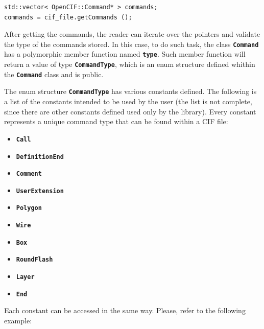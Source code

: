 \documentclass[11pt,twoside,openany,x11names,svgnames]{memoir}
\begin{document}
\begin{lstlisting}[frame=single,style=CPPStyle]
std::vector< OpenCIF::Command* > commands;
commands = cif_file.getCommands ();
\end{lstlisting}

After getting the commands, the reader can iterate over the pointers and validate the type of the commands stored. In this case, to do such task, the class \textbf{\texttt{Command}} has a polymorphic member function named \textbf{\texttt{type}}. Such member function will return a value of type \textbf{\texttt{CommandType}}, which is an enum structure defined whithin the \textbf{\texttt{Command}} class and is public.

The enum structure \textbf{\texttt{CommandType}} has various constants defined. The following is a list of the constants intended to be used by the user (the list is not complete, since there are other constants defined used only by the library). Every constant represents a unique command type that can be found within a CIF file:

\begin{itemize}
	\item \textbf{\texttt{Call}}
	\item \textbf{\texttt{DefinitionEnd}}
	\item \textbf{\texttt{Comment}}
	\item \textbf{\texttt{UserExtension}}
	\item \textbf{\texttt{Polygon}}
	\item \textbf{\texttt{Wire}}
	\item \textbf{\texttt{Box}}
	\item \textbf{\texttt{RoundFlash}}
	\item \textbf{\texttt{Layer}}
	\item \textbf{\texttt{End}}
\end{itemize}

Each constant can be accessed in the same way. Please, refer to the following example:
\end{document}
